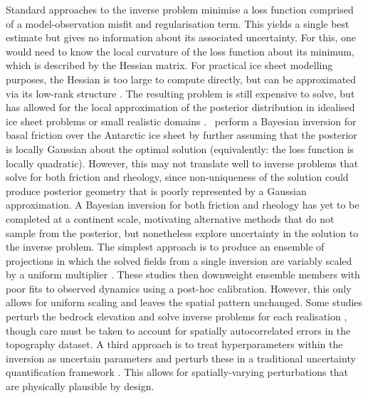\documentclass[journal abbreviation, manuscript]{copernicus}
\begin{document}
Standard approaches to the inverse problem minimise a loss function comprised of a model-observation misfit and regularisation term. This yields a single best estimate but gives no information about its associated uncertainty. For this, one would need to know the local curvature of the loss function about its minimum, which is described by the Hessian matrix. For practical ice sheet modelling purposes, the Hessian is too large to compute directly, but can be approximated via its low-rank structure \citep{petraComputationalFrameworkInfiniteDimensional2014}. The resulting problem is still expensive to solve, but has allowed for the local approximation of the posterior distribution in idealised ice sheet problems \citep{petraComputationalFrameworkInfiniteDimensional2014,babaniyiInferringBasalSliding2021} or small realistic domains \citep{gopalanBayesianInferenceIce2021,brinkerhoffVariationalInferenceGlacier2022}.~\cite{isaacScalableEfficientAlgorithms2015} perform a Bayesian inversion for basal friction over the Antarctic ice sheet by further assuming that the posterior is locally Gaussian about the optimal solution (equivalently: the loss function is locally quadratic). However, this may not translate well to inverse problems that solve for both friction and rheology, since non-uniqueness of the solution could produce posterior geometry that is poorly represented by a Gaussian approximation. A Bayesian inversion for both friction and rheology has yet to be completed at a continent scale, motivating alternative methods that do not sample from the posterior, but nonetheless explore uncertainty in the solution to the inverse problem. The simplest approach is to produce an ensemble of projections in which the solved fields from a single inversion are variably scaled by a uniform multiplier \citep[e.g.][]{niasContrastingModelledSensitivity2016,bevanAmundsenSeaEmbayment2023}. These studies then downweight ensemble members with poor fits to observed dynamics using a post-hoc calibration. However, this only allows for uniform scaling and leaves the spatial pattern unchanged. Some studies perturb the bedrock elevation and solve inverse problems for each realisation \citep{werneckeQuantifyingImpactBedrock2022,krishnaQuantifyingUncertaintyGreenlands2026}, though care must be taken to account for spatially autocorrelated errors in the topography dataset. A third approach is to treat hyperparameters within the inversion as uncertain parameters and perturb these in a traditional uncertainty quantification framework \citep{rosierCalibratedSeaLevel2025}. This allows for spatially-varying perturbations that are physically plausible by design.
\end{document}
